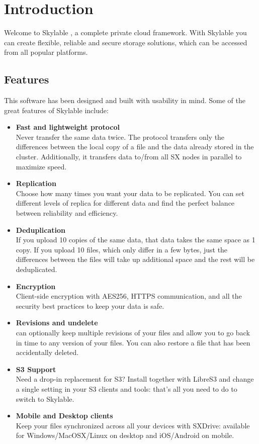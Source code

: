 \chapter{Introduction}
Welcome to Skylable \SX, a complete private cloud framework. With Skylable \SX
you can create flexible, reliable and secure storage solutions, which can
be accessed from all popular platforms.

\section{\ifpdf\texorpdfstring{\SX Features}{SX Features}\fi}
This software has been designed and built with usability in mind. Some
of the great features of Skylable \SX include:
\begin{itemize}
    \item \textbf{Fast and lightweight protocol}\\
    Never transfer the same data twice. The \SX protocol transfers only the
    differences between the local copy of a file and the data already stored
    in the cluster. Additionally, it transfers data to/from all SX nodes in
    parallel to maximize speed.

    \item \textbf{Replication}\\
    Choose how many times you want your data to be replicated. You can set
    different levels of replica for different data and find the perfect
    balance between reliability and efficiency.

    \item \textbf{Deduplication}\\
    If you upload 10 copies of the same data, that data takes the same
    space as 1 copy. If you upload 10 files, which only differ in a few bytes,
    just the differences between the files will take up additional space and
    the rest will be deduplicated.

    \item \textbf{Encryption}\\
    Client-side encryption with AES256, HTTPS communication, and all the
    security best practices to keep your data is safe.

    \item \textbf{Revisions and undelete}\\
    \SX can optionally keep multiple revisions of your files and allow you to
    go back in time to any version of your files. You can also restore a file
    that has been accidentally deleted.

    \item \textbf{S3 Support}\\
    Need a drop-in replacement for S3? Install \SX together with LibreS3 and
    change a single setting in your S3 clients and tools: that's all you need
    to do to switch to Skylable.

    \item \textbf{Mobile and Desktop clients}\\
    Keep your files synchronized across all your devices with SXDrive: available
    for Windows/MacOSX/Linux on desktop and iOS/Android on mobile.
\end{itemize}

